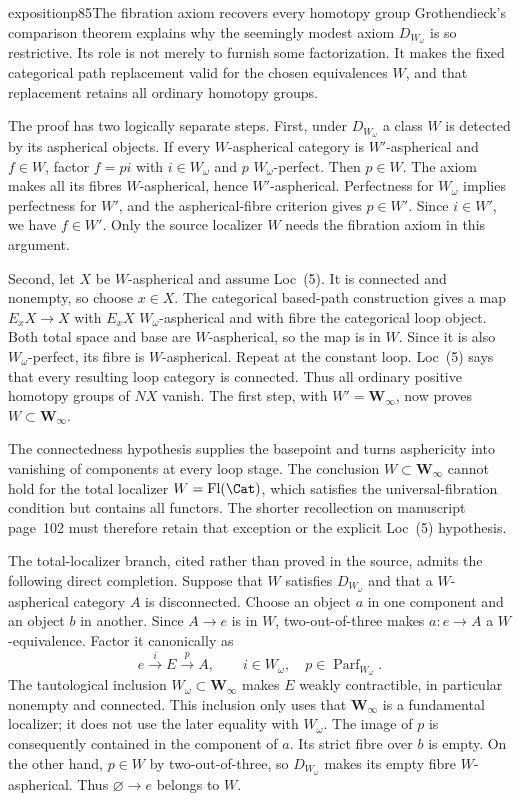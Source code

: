 \begin{dcomment}{exposition}{p85}{The fibration axiom recovers every homotopy group}
Grothendieck's comparison theorem explains why the seemingly modest axiom $D_{W_\omega}$ is so restrictive. Its role is not merely to furnish some factorization. It makes the fixed categorical path replacement valid for the chosen equivalences $W$, and that replacement retains all ordinary homotopy groups.

The proof has two logically separate steps. First, under $D_{W_\omega}$ a class $W$ is detected by its aspherical objects. If every $W$-aspherical category is $W'$-aspherical and $f\in W$, factor $f=pi$ with $i\in W_\omega$ and $p$ $W_\omega$-perfect. Then $p\in W$. The axiom makes all its fibres $W$-aspherical, hence $W'$-aspherical. Perfectness for $W_\omega$ implies perfectness for $W'$, and the aspherical-fibre criterion gives $p\in W'$. Since $i\in W'$, we have $f\in W'$. Only the source localizer $W$ needs the fibration axiom in this argument.

Second, let $X$ be $W$-aspherical and assume Loc~(5). It is connected and nonempty, so choose $x\in X$. The categorical based-path construction gives a map $E_xX\to X$ with $E_xX$ $W_\omega$-aspherical and with fibre the categorical loop object. Both total space and base are $W$-aspherical, so the map is in $W$. Since it is also $W_\omega$-perfect, its fibre is $W$-aspherical. Repeat at the constant loop. Loc~(5) says that every resulting loop category is connected. Thus all ordinary positive homotopy groups of $NX$ vanish. The first step, with $W'=\mathbf W_\infty$, now proves $W\subset\mathbf W_\infty$.

The connectedness hypothesis supplies the basepoint and turns asphericity into vanishing of components at every loop stage. The conclusion $W\subset\mathbf W_\infty$ cannot hold for the total localizer $W=\operatorname{Fl}(\Cat)$, which satisfies the universal-fibration condition but contains all functors. The shorter recollection on manuscript page~102 must therefore retain that exception or the explicit Loc~(5) hypothesis.

The total-localizer branch, cited rather than proved in the source, admits the following direct completion. Suppose that $W$ satisfies $D_{W_\omega}$ and that a $W$-aspherical category $A$ is disconnected. Choose an object $a$ in one component and an object $b$ in another. Since $A\to e$ is in $W$, two-out-of-three makes $a:e\to A$ a $W$-equivalence. Factor it canonically as
\[
 e\xrightarrow{i}E\xrightarrow{p}A,
 \qquad i\in W_\omega,\quad p\in\operatorname{Parf}_{W_\omega}.
\]
The tautological inclusion $W_\omega\subset\mathbf W_\infty$ makes $E$ weakly contractible, in particular nonempty and connected. This inclusion only uses that $\mathbf W_\infty$ is a fundamental localizer; it does not use the later equality with $W_\omega$. The image of $p$ is consequently contained in the component of $a$. Its strict fibre over $b$ is empty. On the other hand, $p\in W$ by two-out-of-three, so $D_{W_\omega}$ makes its empty fibre $W$-aspherical. Thus $\varnothing\to e$ belongs to $W$.


\end{dcomment}
